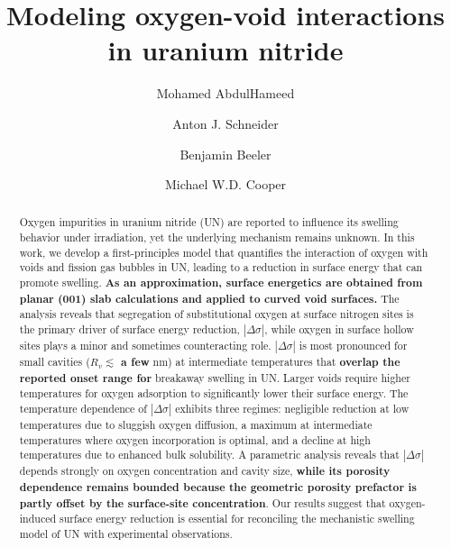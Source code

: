 \documentclass[preprint,12pt,sort&compress]{elsarticle}
\newcommand{\?}{\stackrel{?}{=}}
\providecommand{\DIFaddtex}[1]{{\bf #1}} %
\providecommand{\DIFdeltex}[1]{} %
\providecommand{\DIFaddbegin}{\protect\color{blue}} %
\providecommand{\DIFaddend}{\protect\color{black}} %
\providecommand{\DIFdelbegin}{\protect\color{red}} %
\providecommand{\DIFdelend}{\protect\color{black}} %
\providecommand{\DIFadd}[1]{\texorpdfstring{\DIFaddtex{#1}}{#1}} %
\providecommand{\DIFdel}[1]{\texorpdfstring{\DIFdeltex{#1}}{}} %
\begin{document}
\begin{frontmatter}

\title{Modeling oxygen-void interactions in uranium nitride}

\author[ncsu]{Mohamed AbdulHameed}
\author[lanl]{Anton J. Schneider}
\author[ncsu,inl]{Benjamin Beeler}
\author[lanl]{Michael W.D. Cooper}

\address[ncsu]{Department of Nuclear Engineering, North Carolina State University, Raleigh, NC 27695}
\address[lanl]{Los Alamos National Laboratory, Los Alamos, NM 87545}
\address[inl]{Idaho National Laboratory, Idaho Falls, ID 83415}

\begin{abstract}

Oxygen impurities in uranium nitride (UN) are reported to influence its swelling behavior under irradiation, yet the underlying mechanism remains unknown. In this work, we develop a first-principles model that quantifies the interaction of oxygen with voids and fission gas bubbles in UN, leading to a reduction in surface energy that can promote swelling. \DIFaddbegin \DIFadd{As an approximation, surface energetics are obtained from planar (001) slab calculations and applied to curved void surfaces. }\DIFaddend The analysis reveals that segregation of substitutional oxygen at surface nitrogen sites is the primary driver of surface energy reduction, $|\Delta \sigma|$, while oxygen in surface hollow sites plays a minor and sometimes counteracting role. $|\Delta \sigma|$ is most pronounced for small cavities (\DIFdelbegin \DIFdel{$R_v$ = 1--10 }\DIFdelend \DIFaddbegin \DIFadd{$R_v \lesssim$ a few }\DIFaddend nm) at intermediate temperatures that \DIFdelbegin \DIFdel{coincide with the onset of }\DIFdelend \DIFaddbegin \DIFadd{overlap the reported onset range for }\DIFaddend breakaway swelling in UN. Larger voids require higher temperatures for oxygen adsorption to significantly lower their surface energy. The temperature dependence of $|\Delta \sigma|$ exhibits three regimes: negligible reduction at low temperatures due to sluggish oxygen diffusion, a maximum at intermediate temperatures where oxygen incorporation is optimal, and a decline at high temperatures due to enhanced bulk solubility. A parametric analysis reveals that $|\Delta \sigma|$ depends strongly on \DIFdelbegin \DIFdel{both }\DIFdelend oxygen concentration and cavity size, \DIFdelbegin \DIFdel{but only weakly on porosity }\DIFdelend \DIFaddbegin \DIFadd{while its porosity dependence remains bounded because the geometric porosity prefactor is partly offset by the surface-site concentration}\DIFaddend . Our results suggest that oxygen-induced surface energy reduction is essential for reconciling the mechanistic swelling model of UN with experimental observations.


\end{abstract}
\end{frontmatter}
\end{document}
